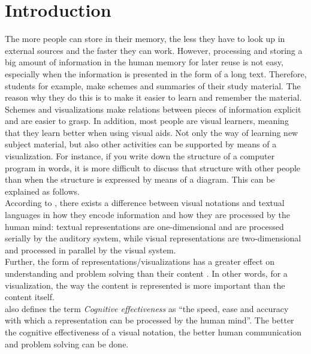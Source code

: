 \chapter{Introduction}\label{ch:introduction}

The more people can store in their memory, the less they have to look up in external sources and the faster they can work. However, processing and storing a big amount of information in the human memory for later reuse is not easy, especially when the information is presented in the form of a long text. Therefore, students for example, make schemes and summaries of their study material. The reason why they do this is to make it easier to learn and remember the material. Schemes and visualizations make relations between pieces of information explicit and are easier to grasp. In addition, most people are visual learners, meaning that they learn better when using visual aids. Not only the way of learning new subject material, but also other activities can be supported by means of a visualization. For instance, if you write down the structure of a computer program in words, it is more difficult to discuss that structure with other people than when the structure is expressed by means of a diagram. This can be explained as follows.\\

According to \cite{moody-physicsofnotations-2009}, there exists a difference between visual notations and textual languages in how they encode information and how they are processed by the human mind: textual representations are one-dimensional and are processed serially by the auditory system, while visual representations are two-dimensional and processed in parallel by the visual system.\\

Further, the form of representations/visualizations has a greater effect on understanding and problem solving than their content \citep{moody-physicsofnotations-2009}. In other words, for a visualization, the way the content is represented is more important than the content itself.\\

\cite{moody-physicsofnotations-2009} also defines the term \textit{Cognitive effectiveness} as ``the speed, ease and accuracy with which a representation can be processed by the human mind''. The better the cognitive effectiveness of a visual notation, the better human communication and problem solving can be done.\\

